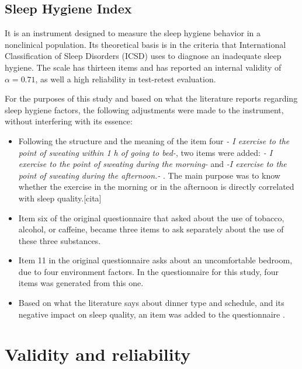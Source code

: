 \documentclass[]{book}
\begin{document}
\subsection{Sleep Hygiene Index}\label{sleep-hygiene-index}

It is an instrument designed to measure the sleep hygiene behavior in a
nonclinical population. Its theoretical basis is in the criteria that
International Classification of Sleep Disorders (ICSD) uses to diagnose
an inadequate sleep hygiene. The scale has thirteen items and has
reported an internal validity of \(\alpha=0.71\), as well a high
reliability in test-retest evaluation\citep{mastin2006}.

For the purposes of this study and based on what the literature reports
regarding sleep hygiene factors, the following adjustments were made to
the instrument, without interfering with its essence:

\begin{itemize}
\item
  Following the structure and the meaning of the item four \emph{- I
  exercise to the point of sweating within 1 h of going to bed-}, two
  items were added: \emph{- I exercise to the point of sweating during
  the morning-} and \emph{-I exercise to the point of sweating during
  the afternoon.- }. The main purpose was to know whether the exercise
  in the morning or in the afternoon is directly correlated with sleep
  quality.{[}cita{]}
\item
  Item six of the original questionnaire that asked about the use of
  tobacco, alcohol, or caffeine, became three items to ask separately
  about the use of these three substances.
\item
  Item 11 in the original questionnaire asks about an uncomfortable
  bedroom, due to four environment factors. In the questionnaire for
  this study, four items was generated from this one.
\item
  Based on what the literature says about dinner type and schedule, and
  its negative impact on sleep quality, an item was added to the
  questionnaire
  \citep[Stefano2014,\citet{Irish2015},\citet{Wentz2011}]{Posner2011}.
\end{itemize}

\section{Validity and reliability}\label{validity-and-reliability}
\end{document}
